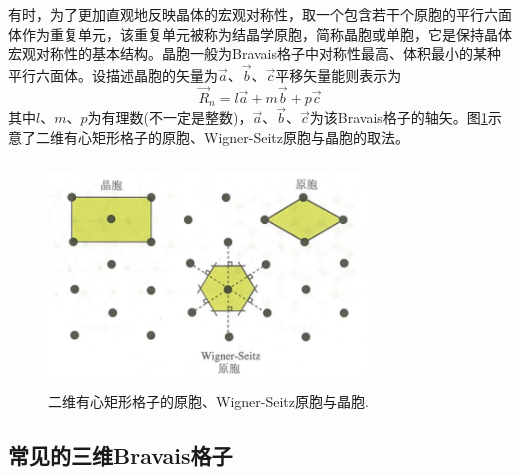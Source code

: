 有时，为了更加直观地反映晶体的宏观对称性，取一个包含若干个原胞的平行六面体作为重复单元，该重复单元被称为结晶学原胞，简称晶胞或单胞，它是保持晶体宏观对称性的基本结构。晶胞一般为Bravais格子中对称性最高、体积最小的某种平行六面体。设描述晶胞的矢量为$\vec a$、$\vec b$、$\vec c$平移矢量能则表示为
\begin{equation}
	\vec R_n=l\vec a +m\vec b+p\vec c
	\label{eq:SSI-09}
\end{equation}
其中$l$、$m$、$p$为有理数(不一定是整数)，$\vec a$、$\vec b$、$\vec c$为该Bravais格子的轴矢。图\ref{Fig:Crystal-Primitive_Cell}示意了二维有心矩形格子的原胞、Wigner-Seitz原胞与晶胞的取法。
\begin{figure}[h!]
\centering
\vspace*{-0.05in}
\includegraphics[height=2.35in,width=3.35in,viewport=0 0 80 55,clip]{Figures/Crystal-Primitive_Cell.png}
\caption{\small \textrm{二维有心矩形格子的原胞、Wigner-Seitz原胞与晶胞.}}%
\label{Fig:Crystal-Primitive_Cell}
\end{figure}

\subsection{常见的三维Bravais格子}
